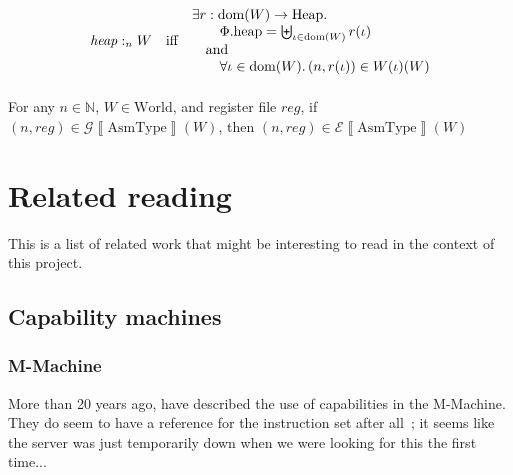 \documentclass{article}
\newcommand{\forcenewline}{$\phantom{v}$\\}
\newcommand{\sem}[1]{\left\llbracket #1 \right\rrbracket}
\DeclareMathOperator{\dom}{dom}
\newcommand{\var}[1]{\mathit{#1}}
\newcommand{\reg}{\var{reg}}
\newcommand{\heap}{\var{heap}}
\newcommand{\plainproj}[1]{\mathrm{#1}}
\newcommand{\memheap}[1][\Phi]{#1.\plainproj{heap}}
\newcommand{\heapSat}[3][\heap]{#1 :_{#2} #3}
\newcommand{\asmType}{\plaindom{AsmType}}
\newcommand{\plaindom}[1]{\mathrm{#1}}
\newcommand{\Heaps}{\plaindom{Heap}}
\newcommand{\nats}{\mathbb{N}}
\newcommand{\Worlds}{\plaindom{World}}
\newcommand{\intr}[2]{\mathcal{#1}\sem{#2}}
\newcommand{\exprintr}[1]{\intr{E}{#1}}
\newcommand{\envintr}[1]{\intr{G}{#1}}
\newcommand{\stder}{\exprintr{\asmType}}
\newcommand{\stdgr}{\envintr{\asmType}}
\newcommand{\npair}[2][n]{\left(#1,#2 \right)}
\begin{document}
\begin{definition}
\begin{align*}
  \heapSat{n}{W} & & \text{iff} & &
                                      \arraycolsep=0pt
                                      \begin{array}{l}
                                      \exists r: \dom(W) \rightarrow \Heaps \ldotp \\
                                      \qquad\memheap = \biguplus_{\iota\in \dom(W)} r(\iota)\\
                                      \quad\text{and}\\
                                      \qquad\forall \iota \in \dom(W) \ldotp \npair{r(\iota)} \in W(\iota)(W)
                                      \end{array}\\
\end{align*}


\end{definition}
\begin{lemma} \forcenewline
  For any $n \in \nats$, $W \in \Worlds$, and register file $\reg$, if  $\npair{\reg} \in \stdgr(W)$, then $(n,\reg) \in \stder(W)$
\end{lemma}

\section{Related reading}
\label{sec:related-reading}

This is a list of related work that might be interesting to read in the context
of this project.

\subsection{Capability machines}
\label{sec:rw-cap-machines}

\subsubsection{M-Machine}
More than 20 years ago, \cite{Carter:1994:HSF:195473.195579} have described the
use of capabilities in the M-Machine. They do seem to have a reference for the
instruction set after all~\citep{Dally1997Memo59}; it seems like the server was
just temporarily down when we were looking for this the first time...
\end{document}
